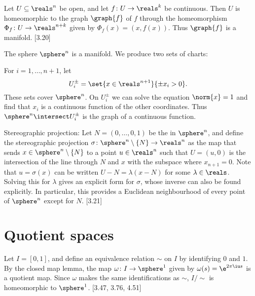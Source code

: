 \documentclass[article, a4paper, 11pt, oneside]{memoir}
\numberwithin{equation}{chapter}
\begin{document}
\begin{example}
    Let $U \subseteq \reals^n$ be open, and let $f \colon U \to \reals^k$ be continuous. Then $U$ is homeomorphic to the graph $\graph{f}$ of $f$ through the homeomorphism $\Phi_f \colon U \to \reals^{n+k}$ given by $\Phi_f(x) = (x, f(x))$. Thus $\graph{f}$ is a manifold. [3.20]
\end{example}


\begin{example}[Spheres]
    The sphere $\sphere^n$ is a manifold. We produce two sets of charts:

    For $i = 1, \ldots, n+1$, let
    \begin{equation*}
        U_i^\pm = \set{x \in \reals^{n+1}}{{\pm x_i} > 0}.
    \end{equation*}
    These sets cover $\sphere^n$. On $U_i^\pm$ we can solve the equation $\norm{x} = 1$ and find that $x_i$ is a continuous function of the other coordinates. Thus $\sphere^n \intersect U_i^\pm$ is the graph of a continuous function.

    Stereographic projection: Let $N = (0, \ldots, 0, 1)$ be the  in $\sphere^n$, and define the stereographic projection $\sigma \colon \sphere^n \setminus \{N\} \to \reals^n$ as the map that sends $x \in \sphere^n \setminus \{N\}$ to a point $u \in \reals^n$ such that $U = (u,0)$ is the intersection of the line through $N$ and $x$ with the subspace where $x_{n+1} = 0$. Note that $u = \sigma(x)$ can be written $U - N = \lambda (x - N)$ for some $\lambda \in \reals$. Solving this for $\lambda$ gives an explicit form for $\sigma$, whose inverse can also be found explicitly. In particular, this provides a Euclidean neighbourhood of every point of $\sphere^n$ except for $N$. [3.21]
\end{example}


\chapter{Quotient spaces}

\begin{example}
    Let $I = [0,1]$, and define an equivalence relation $\sim$ on $I$ by identifying $0$ and $1$. By the closed map lemma, the map $\omega \colon I \to \sphere^1$ given by $\omega(s) = \e^{2\pi \iu s}$ is a quotient map. Since $\omega$ makes the same identifications as $\sim$, $I/{\sim}$ is homeomorphic to $\sphere^1$. [3.47, 3.76, 4.51]
\end{example}
\end{document}
